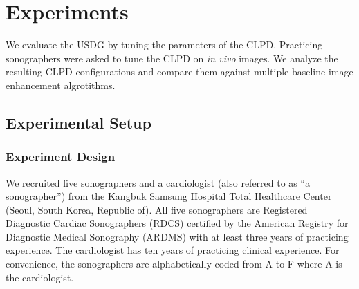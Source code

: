 

%

\section{Experiments}\label{section:eval}
We evaluate the USDG by tuning the parameters of the CLPD.
Practicing sonographers were asked to tune the CLPD on \textit{in vivo} images.
We analyze the resulting CLPD configurations and compare them against multiple baseline image enhancement algrotithms.

\subsection{Experimental Setup}
\subsubsection{Experiment Design}\label{section:experiment_design}
We recruited five sonographers and a cardiologist (also referred to as ``a sonographer'') from the Kangbuk Samsung Hospital Total Healthcare Center (Seoul, South Korea, Republic of).
All five sonographers are Registered Diagnostic Cardiac Sonographers (RDCS) certified by the American Registry for Diagnostic Medical Sonography (ARDMS) with at least three years of practicing experience.
The cardiologist has ten years of practicing clinical experience.
For convenience, the sonographers are alphabetically coded from A to F where A is the cardiologist.

